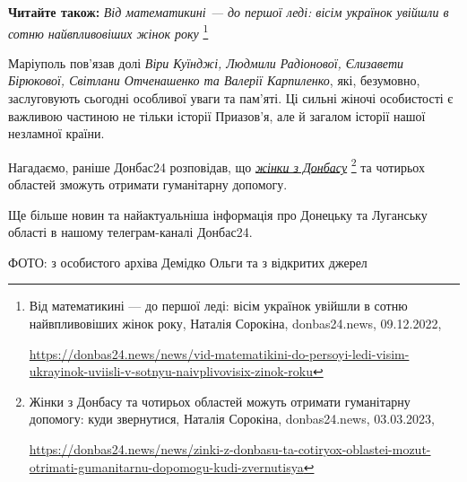 \textbf{Читайте також:} \emph{Від математикині — до першої леді: вісім українок увійшли в сотню найвпливовіших жінок року}%
\footnote{Від математикині — до першої леді: вісім українок увійшли в сотню найвпливовіших жінок року, Наталія Сорокіна, donbas24.news, 09.12.2022, \par%
\url{https://donbas24.news/news/vid-matematikini-do-persoyi-ledi-visim-ukrayinok-uviisli-v-sotnyu-naivplivovisix-zinok-roku}%
}

Маріуполь пов'язав долі \emph{Віри Куїнджі, Людмили Радіонової, Єлизавети Бірюкової,
Світлани Отченашенко та Валерії Карпиленко}, які, безумовно, заслуговують
сьогодні особливої уваги та пам'яті. Ці сильні жіночі особистості є важливою
частиною не тільки історії Приазов'я, але й загалом історії нашої незламної
країни.

Нагадаємо, раніше Донбас24 розповідав, що \href{https://donbas24.news/news/zinki-z-donbasu-ta-cotiryox-oblastei-mozut-otrimati-gumanitarnu-dopomogu-kudi-zvernutisya}{\emph{жінки з Донбасу}}%
\footnote{Жінки з Донбасу та чотирьох областей можуть отримати гуманітарну допомогу: куди звернутися, Наталія Сорокіна, donbas24.news, 03.03.2023, \par\url{https://donbas24.news/news/zinki-z-donbasu-ta-cotiryox-oblastei-mozut-otrimati-gumanitarnu-dopomogu-kudi-zvernutisya}} %
та чотирьох областей зможуть отримати гуманітарну допомогу.

Ще більше новин та найактуальніша інформація про Донецьку та Луганську області
в нашому телеграм-каналі Донбас24.

ФОТО: з особистого архіва Демідко Ольги та з відкритих джерел

